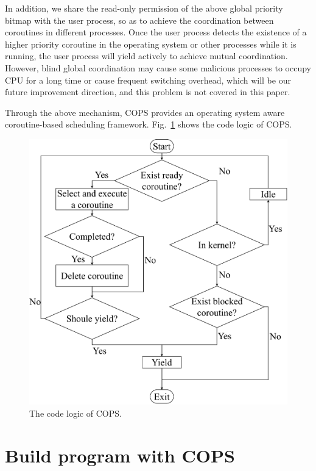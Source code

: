 \documentclass[sigconf,review,anonymous]{acmart}
\begin{document}
In addition, we share the read-only permission of the above global priority bitmap with the user process, so as to achieve the coordination between coroutines in different processes. Once the user process detects the existence of a higher priority coroutine in the operating system or other processes while it is running, the user process will yield actively to achieve mutual coordination. However, blind global coordination may cause some malicious processes to occupy CPU for a long time or cause frequent switching overhead, which will be our future improvement direction, and this problem is not covered in this paper.

Through the above mechanism, COPS provides an operating system aware coroutine-based scheduling framework. Fig.~\ref{fig:flow} shows the code logic of COPS.

\begin{figure}[h]
  \centering
  \includegraphics[width=\linewidth]{assets/flow.pdf}
  \caption{The code logic of COPS.}
  \label{fig:flow}
\end{figure}

\section{Build program with {COPS}}
\end{document}
